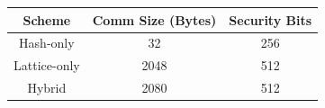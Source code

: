 \begin{tabular}{ccc}
\hline
Scheme & Comm Size (Bytes) & Security Bits \\
\hline
Hash-only & 32 & 256 \\
Lattice-only & 2048 & 512 \\
Hybrid & 2080 & 512 \\
\hline
\end{tabular}
